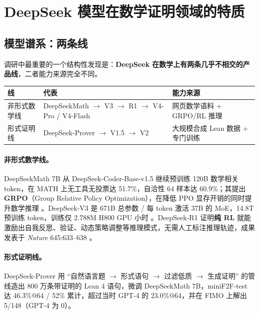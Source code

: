 \documentclass[UTF8,a4paper,11pt,fontset=windows]{ctexart}
\begin{document}
\section{DeepSeek 模型在数学证明领域的特质}

\subsection{模型谱系：两条线}

调研中最重要的一个结构性发现是：\textbf{DeepSeek 在数学上有两条几乎不相交的产品线}，二者能力来源完全不同。

\begin{center}
\small
\begin{tabular}{@{}lll@{}}
\toprule
\textbf{线} & \textbf{代表} & \textbf{能力来源} \\
\midrule
非形式数学线 & DeepSeekMath $\rightarrow$ V3 $\rightarrow$ R1 $\rightarrow$ V4-Pro / V4-Flash & 网页数学语料 + GRPO/RL 推理 \\
形式证明线 & DeepSeek-Prover $\rightarrow$ V1.5 $\rightarrow$ V2 & 大规模合成 Lean 数据 + 专门训练 \\
\bottomrule
\end{tabular}
\end{center}

\paragraph{非形式数学线。}DeepSeekMath 7B 从 DeepSeek-Coder-Base-v1.5 继续预训练 120B 数学相关 token，在 MATH 上无工具无投票达 51.7\%，自洽性 64 样本达 60.9\%；其提出 \textbf{GRPO}（Group Relative Policy Optimization），在降低 PPO 显存开销的同时提升数学推理 \cite{deepseekmath}。DeepSeek-V3 是 671B 总参数 / 每 token 激活 37B 的 MoE，14.8T 预训练 token，训练仅 2.788M H800 GPU 小时 \cite{deepseekv3}。DeepSeek-R1 证明\textbf{纯 RL} 就能激励出自我反思、验证、动态策略调整等推理模式，无需人工标注推理轨迹，成果发表于 \emph{Nature} 645:633--638 \cite{deepseekr1}。

\paragraph{形式证明线。}DeepSeek-Prover 用 ``自然语言题 $\rightarrow$ 形式语句 $\rightarrow$ 过滤低质 $\rightarrow$ 生成证明'' 的管线造出 800 万条带证明的 Lean 4 语句，微调 DeepSeekMath 7B，miniF2F-test 达 46.3\%@64 / 52\% 累计，超过当时 GPT-4 的 23.0\%@64，并在 FIMO 上解出 5/148（GPT-4 为 0）\cite{dsprover}。
\end{document}
